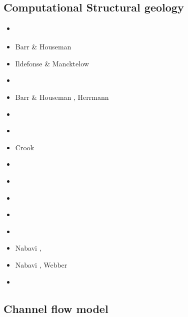 \subsection{Computational Structural geology}

\begin{scriptsize}
\begin{itemize}
\item[\nineteenseventyone] \cite{stbe71}
\item[\nineteenninetytwo] Barr \& Houseman \cite{baho92}
\item[\nineteenninetythree] Ildefonse \& Mancktelow \cite{ilma93}
\item[\nineteenninetyfive] \cite{fige95}
\item[\nineteenninetysix] Barr \& Houseman \cite{baho96}, Herrmann \etal \cite{hept96}
\item[\twothousand] \cite{acgf00}\cite{trla00}
\item[\twothousandone] \cite{masc01}
\item[\twothousandsix] Crook \etal \cite{crwy06}
\item[\twothousandeight] \cite{manc08}\cite{scsf08}
\item[\twothousandeleven] \cite{frem11}
\item[\twothousandthirteen] \cite{soma13}\cite{lehl13}
\item[\twothousandfourteen] \cite{olbm14}
\item[\twothousandfifteen] \cite{pevp15}\cite{jalr15}
\item[\twothousandseventeen] Nabavi \etal \cite{naam17}, \cite{scdu17}
\item[\twothousandeighteen] Nabavi \etal \cite{naam18}, Webber \etal \cite{weef18}
\item[\twothousandnineteen] \cite{llor19}\cite{yada19}\cite{sogh19}
\end{itemize}
\end{scriptsize}

\subsection{Channel flow model} 

